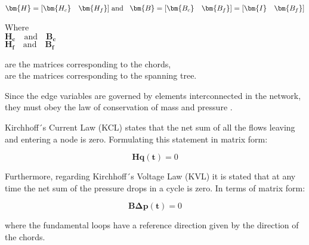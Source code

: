 \begin{equation}
\bm{H} = [\bm{H_c} \quad \bm{H_f}]
\hspace{0.1cm} \text{and}\hspace{0.3cm}
\bm{B} = [\bm{B_c}  \quad \bm{B_f}] = [\bm{I} \quad \bm{B_f}]
\label{HandB}
\end{equation}

\begin{minipage}[t]{0.20\textwidth}
Where\\
\hspace*{8mm} $\bm{H_c} \quad \text{and} \quad \bm{B_c}$ \\
\hspace*{8mm} $\bm{H_f} \quad \text{and} \quad \bm{B_f}$ 
\end{minipage}
\begin{minipage}[t]{0.68\textwidth}
\vspace*{2mm}
\hspace*{8mm} are the matrices corresponding to the chords,\\
\hspace*{8mm} are the matrices corresponding to the spanning tree. 
\end{minipage}

Since the edge variables are governed by elements interconnected in the network, 
they must obey the law of conservation of mass and pressure \cite{GraphModel}. 

Kirchhoff´s Current Law (KCL) states that the net sum of all the flows leaving and entering a node is zero. Formulating this statement in matrix form:

\begin{equation}
  \label{KCL}
  \bm{H} \bm{q(t)} = 0
\end{equation}

Furthermore, regarding Kirchhoff´s Voltage Law (KVL) it is stated that at any time the net sum of the pressure drops in a cycle 
is zero. In terms of matrix form:

\begin{equation}
 \label{KVL} 
 \pmb{B}  \pmb{\Delta p (t)} = 0
\end{equation}

where the fundamental loops have a reference direction given by the direction of the 
chords. 





 